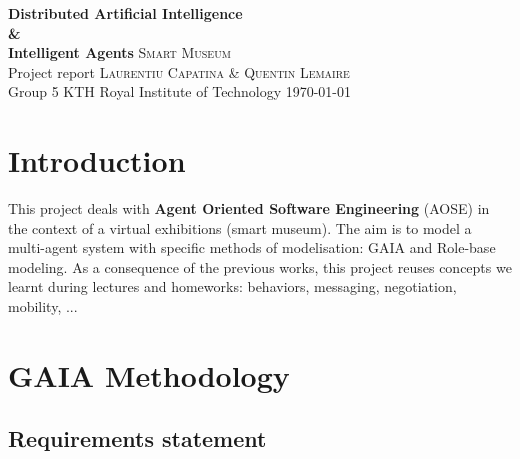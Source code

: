 \documentclass[a4paper,11pt]{report}
\begin{document}
\begin{titlepage}
  \centering
  \vfill
    {\bfseries\Large{
	Distributed Artificial Intelligence\\\&\\Intelligent Agents}
    }
  \vfill
  \vfill
    \Huge{\textsc{Smart Museum}}
    \\\vspace{10pt}
    \Large{Project report}
  \vfill
      \Large{\textsc{Laurentiu Capatina} \& \textsc{Quentin Lemaire}}
    \\
  \vspace{0.4cm}
    Group 5
  \vfill
  \vfill
    KTH Royal Institute of Technology
  \vfill
    \today
  \thispagestyle{empty}
\end{titlepage}

\tableofcontents{} %
\clearpage %
\setcounter{page}{1} %

  \section{Introduction}
  
  This project deals with \textbf{Agent Oriented Software Engineering} (AOSE) in the 
  context of a virtual exhibitions (smart museum). The aim is to model a multi-agent 
  system with specific methods of modelisation: GAIA and Role-base modeling.
  As a consequence of the previous works, this project reuses concepts we learnt 
  during lectures and homeworks: behaviors, messaging, negotiation, mobility, ...
  
  
  
  
  \section{GAIA Methodology} %
  
  \subsection{Requirements statement}
  
\end{document}
